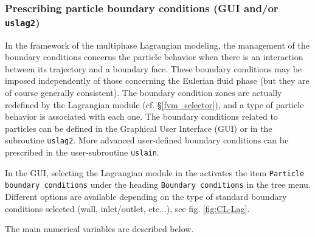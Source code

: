 {{%
\subsubsection{Prescribing particle boundary conditions (GUI and/or \texttt{uslag2})}
In the framework of the multiphase Lagrangian modeling, the management of the boundary conditions concerns the particle behavior when there is an interaction between its trajectory and a boundary face. These boundary conditions may be imposed independently of those concerning the Eulerian fluid phase (but they are of course generally consistent). The boundary condition zones are actually redefined by the Lagrangian module (cf. \S\ref{fvm_selector}), and a type of particle behavior is associated with each one. The boundary conditions related to particles can be defined in the Graphical User Interface (GUI) or in the subroutine \texttt{uslag2}. More advanced user-defined boundary conditions can be prescribed in the user-subroutine \texttt{uslain}.


 In the GUI, selecting the Lagrangian module in the activates the item \texttt{Particle boundary conditions} under the heading \texttt{Boundary conditions} in the tree menu. Different options are available depending on the type of standard boundary conditions selected (wall, inlet/outlet, etc...), see fig. \ref{fig:CL-Lag}.



The main numerical variables are described below.


}}
